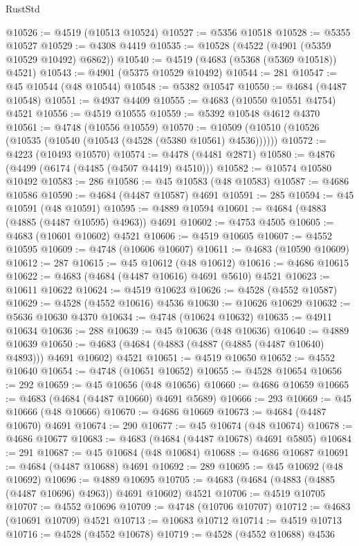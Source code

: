 \begin{lexlean}{RustStd}
\begin{coremodule}
@10526 := @4519 (@10513 @10524)
@10527 := @5356 @10518
@10528 := @5355 @10527
@10529 := @4308 @4419
@10535 := @10528 (@4522 (@4901 (@5359 @10529 @10492) @6862))
@10540 := @4519 (@4683 (@5368 (@5369 @10518)) @4521)
@10543 := @4901 (@5375 @10529 @10492)
@10544 := 281
@10547 := @45 @10544 (@48 @10544)
@10548 := @5382 @10547
@10550 := @4684 (@4487 @10548)
@10551 := @4937 @4409
@10555 := @4683 (@10550 @10551 @4754) @4521
@10556 := @4519 @10555
@10559 := @5392 @10548 @4612 @4370
@10561 := @4748 (@10556 @10559)
@10570 := @10509 (@10510 (@10526 (@10535 (@10540 (@10543 (@4528 (@5380 @10561) @4536))))))
@10572 := @4223 (@10493 @10570)
@10574 := @4478 (@4481 @2871)
@10580 := @4876 (@4499 (@6174 (@4485 (@4507 @4419) @4510)))
@10582 := @10574 @10580 @10492
@10583 := 286
@10586 := @45 @10583 (@48 @10583)
@10587 := @4686 @10586
@10590 := @4684 (@4487 @10587) @4691
@10591 := 285
@10594 := @45 @10591 (@48 @10591)
@10595 := @4889 @10594
@10601 := @4684 (@4883 (@4885 (@4487 @10595) @4963)) @4691
@10602 := @4753 @4505
@10605 := @4683 (@10601 @10602) @4521
@10606 := @4519 @10605
@10607 := @4552 @10595
@10609 := @4748 (@10606 @10607)
@10611 := @4683 (@10590 @10609)
@10612 := 287
@10615 := @45 @10612 (@48 @10612)
@10616 := @4686 @10615
@10622 := @4683 (@4684 (@4487 @10616) @4691 @5610) @4521
@10623 := @10611 @10622
@10624 := @4519 @10623
@10626 := @4528 (@4552 @10587)
@10629 := @4528 (@4552 @10616) @4536
@10630 := @10626 @10629
@10632 := @5636 @10630 @4370
@10634 := @4748 (@10624 @10632)
@10635 := @4911 @10634
@10636 := 288
@10639 := @45 @10636 (@48 @10636)
@10640 := @4889 @10639
@10650 := @4683 (@4684 (@4883 (@4887 (@4885 (@4487 @10640) @4893))) @4691 @10602) @4521
@10651 := @4519 @10650
@10652 := @4552 @10640
@10654 := @4748 (@10651 @10652)
@10655 := @4528 @10654
@10656 := 292
@10659 := @45 @10656 (@48 @10656)
@10660 := @4686 @10659
@10665 := @4683 (@4684 (@4487 @10660) @4691 @5689)
@10666 := 293
@10669 := @45 @10666 (@48 @10666)
@10670 := @4686 @10669
@10673 := @4684 (@4487 @10670) @4691
@10674 := 290
@10677 := @45 @10674 (@48 @10674)
@10678 := @4686 @10677
@10683 := @4683 (@4684 (@4487 @10678) @4691 @5805)
@10684 := 291
@10687 := @45 @10684 (@48 @10684)
@10688 := @4686 @10687
@10691 := @4684 (@4487 @10688) @4691
@10692 := 289
@10695 := @45 @10692 (@48 @10692)
@10696 := @4889 @10695
@10705 := @4683 (@4684 (@4883 (@4885 (@4487 @10696) @4963)) @4691 @10602) @4521
@10706 := @4519 @10705
@10707 := @4552 @10696
@10709 := @4748 (@10706 @10707)
@10712 := @4683 (@10691 @10709) @4521
@10713 := @10683 @10712
@10714 := @4519 @10713
@10716 := @4528 (@4552 @10678)
@10719 := @4528 (@4552 @10688) @4536

\end{coremodule}
\end{lexlean}
